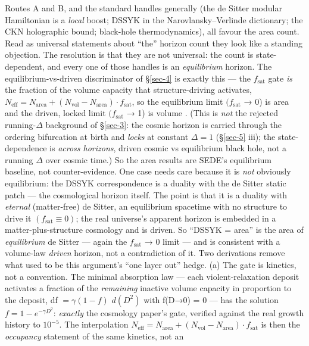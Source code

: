 \documentclass[aps,prd,preprint,nofootinbib,superscriptaddress]{revtex4-2}
\begin{document}
Routes A and B, and the standard handles generally (the de Sitter
modular Hamiltonian is a \emph{local} boost; DSSYK in the
Narovlansky--Verlinde dictionary; the CKN holographic bound; black-hole
thermodynamics), all favour the area count. Read as universal statements
about ``the'' horizon count they look like a standing objection. The
resolution is that they are not universal: the count is state-dependent,
and every one of those handles is an \emph{equilibrium} horizon. The
equilibrium-vs-driven discriminator of §\ref{sec-4} is exactly this ---
the \(f_{\mathrm{sat}}\) gate \emph{is} the fraction of the volume
capacity that structure-driving activates,
\(N_{\mathrm{eff}} = N_{\mathrm{area}} + (N_{\mathrm{vol}} - N_{\mathrm{area}})\cdot f_{\mathrm{sat}}\),
so the equilibrium limit \((f_{\mathrm{sat}}\) → 0) is area and the
driven, locked limit \((f_{\mathrm{sat}}\) → 1) is volume . (This is
\emph{not} the rejected running-\(\Delta\) background of §\ref{sec-3}:
the cosmic horizon is carried through the ordering bifurcation at birth
and \emph{locks} at constant \(\Delta  = 1\) (§\ref{sec-5} iii); the
state-dependence is \emph{across horizons}, driven cosmic vs equilibrium
black hole, not a running \(\Delta\) over cosmic time.) So the area
results are SEDE's equilibrium baseline, not counter-evidence. One case
needs care because it is \emph{not} obviously equilibrium: the DSSYK
correspondence is a duality with the de Sitter static patch --- the
cosmological horizon itself. The point is that it is a duality with
\emph{eternal} (matter-free) de Sitter, an equilibrium spacetime with no
structure to drive it \((f_{\mathrm{sat}} \equiv  0)\); the real
universe's apparent horizon is embedded in a matter-plus-structure
cosmology and is driven. So ``DSSYK = area'' is the area of
\emph{equilibrium} de Sitter --- again the \(f_{\mathrm{sat}}\) → 0
limit --- and is consistent with a volume-law \emph{driven} horizon, not
a contradiction of it. Two derivations remove what used to be this
argument's ``one layer out'' hedge. (a) The gate is kinetics, not a
convention. The minimal absorption law --- each violent-relaxation
deposit activates a fraction of the \emph{remaining} inactive volume
capacity in proportion to the deposit, df \(= \gamma (1 - f)\)
\(d(D^{2})\) with f(D→0) = 0 --- has the solution
\(f = 1 - e^{-\gamma D^{2}}\): \emph{exactly} the cosmology paper's
gate, verified against the real growth history to \(10^{-5}\). The
interpolation
\(N_{\mathrm{eff}} = N_{\mathrm{area}} + (N_{\mathrm{vol}} - N_{\mathrm{area}})\cdot f_{\mathrm{sat}}\)
is then the \emph{occupancy} statement of the same kinetics, not an
\end{document}
